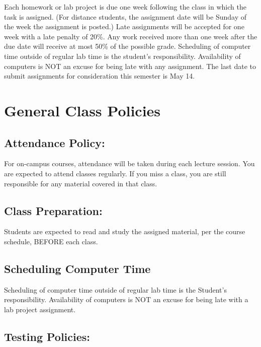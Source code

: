 \documentclass[a4paper]{article}
\begin{document}
Each homework or lab project is due one week following the class in
which the task is assigned. (For distance students, the assignment date will be
Sunday of the week the assignment is posted.) Late assignments will be accepted
for one week with a late penalty of 20\%.  Any work received more than one week
after the due date will receive at most 50\% of the possible grade.  Scheduling
of computer time outside of regular lab time is the student’s responsibility.
Availability of computers is NOT an excuse for being late with any assignment.
The last date to submit assignments for consideration this semester is May 14.


\section{General Class Policies%
  \label{general-class-policies}%
}


\subsection{Attendance Policy:%
  \label{attendance-policy}%
}

For on-campus courses, attendance will be taken during each lecture session.
You are expected to attend classes regularly. If you miss a class, you are
still responsible for any material covered in that class.


\subsection{Class Preparation:%
  \label{class-preparation}%
}

Students are expected to read and study the assigned material, per the course
schedule, BEFORE each class.


\subsection{Scheduling Computer Time%
  \label{scheduling-computer-time}%
}

Scheduling of computer time outside of regular lab time is the Student's
responsibility. Availability of computers is NOT an excuse for being late with
a lab project assignment.


\subsection{Testing Policies:%
  \label{testing-policies}%
}
\end{document}
